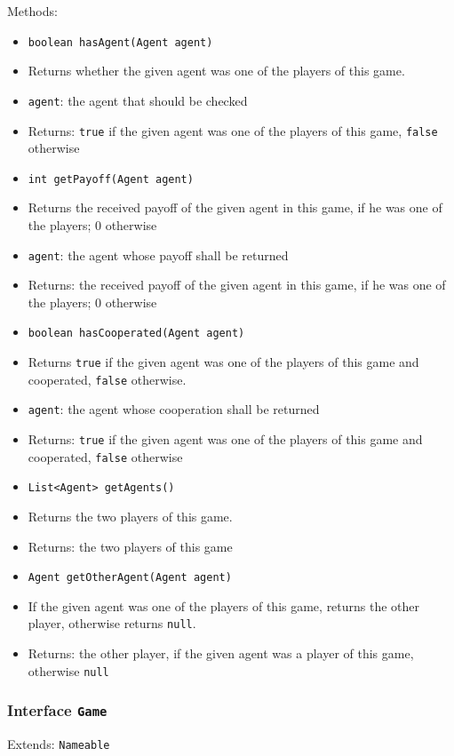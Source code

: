 \documentclass[parskip=full,11pt]{scrartcl}
\begin{document}
Methods:
\begin{itemize}\itemsep -10pt
\item  \texttt{boolean hasAgent(Agent agent)}
\item[] Returns whether the given agent was one of the players of this game.
\item[] \texttt{agent}: the agent that should be checked
\item[] Returns: \texttt{true} if the given agent was one of the players of this game, \texttt{false} otherwise

\item \texttt{int getPayoff(Agent agent)}
\item[] Returns the received payoff of the given agent in this game, if he was one of the players; \(0\) otherwise
\item[] \texttt{agent}: the agent whose payoff shall be returned
\item[] Returns: the received payoff of the given agent in this game, if he was one of the players; \(0\) otherwise

\item \texttt{boolean hasCooperated(Agent agent)}
\item[] Returns \texttt{true} if the given agent was one of the players of this game and cooperated, \texttt{false} otherwise.
\item[] \texttt{agent}: the agent whose cooperation shall be returned
\item[] Returns: \texttt{true} if the given agent was one of the players of this game and cooperated, \texttt{false} otherwise

\item \texttt{List<Agent> getAgents()}
\item[] Returns the two players of this game.
\item[] Returns: the two players of this game

\item \texttt{Agent getOtherAgent(Agent agent)}
\item[] If the given agent was one of the players of this game, returns the other player, otherwise returns \texttt{null}.
\item[] Returns: the other player, if the given agent was a player of this game, otherwise \texttt{null}
\end{itemize}

\subsubsection{Interface \texttt{Game}}
Extends: \texttt{Nameable}
\end{document}
